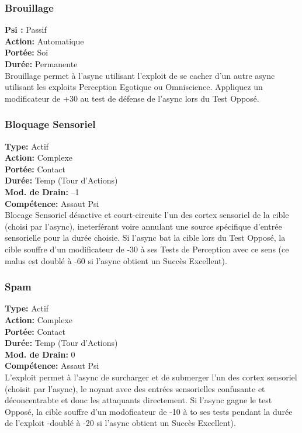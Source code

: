 \subsubsection{Brouillage} \textbf{Psi :} Passif \\ \textbf{Action:} Automatique \\ \textbf{Portée:} Soi \\ \textbf{Durée:} Permanente \\ Brouillage permet à l'async utilisant l'exploit de se cacher d'un autre async utilisant les exploits Perception Egotique ou Omniscience. Appliquez un modificateur de +30 au test de défense de l'async lors du Test Opposé. 

\subsubsection{Bloquage Sensoriel} \textbf{Type:} Actif \\ \textbf{Action:} Complexe \\ \textbf{Portée:} Contact \\ \textbf{Durée:} Temp (Tour d'Actions) \\ \textbf{Mod. de Drain:} –1 \\ \textbf{Compétence:} Assaut Psi \\ Blocage Sensoriel désactive et court-circuite l'un des cortex sensoriel de la cible (choisi par l'async), ineterférant voire annulant une source spécifique d'entrée sensorielle pour la durée choisie. Si l'async bat la cible lors du Test Opposé, la cible souffre d'un modificateur de -30 à ses Tests de Perception avec ce sens (ce malus est doublé à -60 si l'async obtient un Succès Excellent). 



\subsubsection{Spam} \textbf{Type:} Actif \\ \textbf{Action:} Complexe \\ \textbf{Portée:} Contact \\ \textbf{Durée:} Temp (Tour d'Actions) \\ \textbf{Mod. de Drain:} 0 \\ \textbf{Compétence:} Assaut Psi \\ L'exploit permet à l'async de surcharger et de submerger l'un des cortex sensoriel (choisit par l'async), le noyant avec des entrées sensorielles confusante et déconcentrabte et donc les attaquants directement. Si l'async gagne le test Opposé, la cible souffre d'un modoficateur de -10 à to ses tests pendant la durée de l'exploit -doublé à -20 si l'async obtient un Succès Excellent). 

